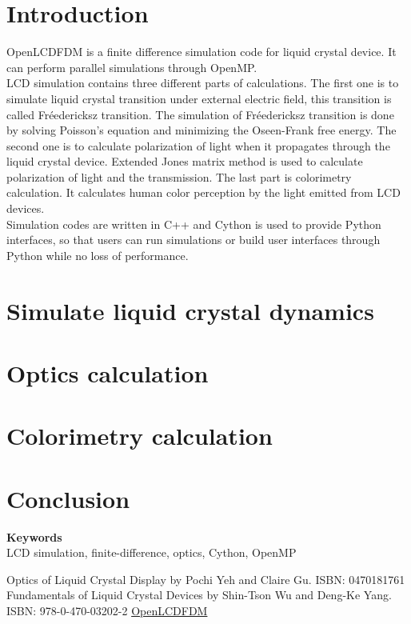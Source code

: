 \documentclass[a4paper]{article} %
\def\keywords#1{\begin{center}{\bf Keywords}\\{#1}\end{center}} %
\begin{document}
\begin{multicols}{2}
\section{Introduction}
OpenLCDFDM is a finite difference simulation code for liquid crystal device. It can perform parallel simulations through OpenMP. \\

LCD simulation contains three different parts of calculations. The first one is to simulate liquid crystal transition under external electric field, this transition is called Fréedericksz transition. The simulation of Fréedericksz transition is done by solving Poisson's equation and minimizing the Oseen-Frank free energy. The second one is to calculate polarization of light when it propagates through the liquid crystal device. Extended Jones matrix method is used to calculate polarization of light and the transmission. The last part is colorimetry calculation. It calculates human color perception by the light emitted from LCD devices.\\

Simulation codes are written in C++ and Cython is used to provide Python interfaces, so that users can run simulations or build user interfaces through Python while no loss of performance.

\section{Simulate liquid crystal dynamics}


\section{Optics calculation}

\section{Colorimetry calculation}

\section{Conclusion}


\end{multicols}
\keywords{LCD simulation, finite-difference, optics, Cython, OpenMP} %


\begin{thebibliography}{9}
Optics of Liquid Crystal Display by Pochi Yeh and Claire Gu. ISBN: 0470181761
Fundamentals of Liquid Crystal Devices by Shin-Tson Wu and Deng-Ke Yang. ISBN: 978-0-470-03202-2
\href{https://github.com/xingularity/OpenLCDFDM}{OpenLCDFDM}
\end{thebibliography}
\end{document}
